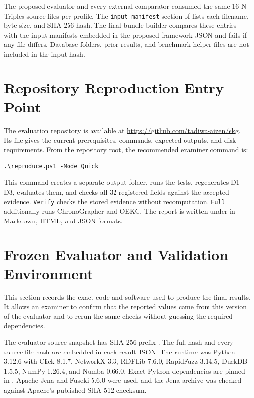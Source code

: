 The proposed evaluator and every external comparator consumed the same 16 N-Triples source files per profile. The \texttt{input\_manifest} section of  lists each filename, byte size, and SHA-256 hash. The final bundle builder compares these entries with the input manifests embedded in the proposed-framework JSON and fails if any file differs. Database folders, prior results, and benchmark helper files are not included in the input hash.

\section{Repository Reproduction Entry Point}

The evaluation repository is available at \url{https://github.com/tadiwa-aizen/ekg}. Its  file gives the current prerequisites, commands, expected outputs, and disk requirements. From the repository root, the recommended examiner command is:

\begin{verbatim}
.\reproduce.ps1 -Mode Quick
\end{verbatim}

This command creates a separate output folder, runs the tests, regenerates D1--D3, evaluates them, and checks all 32 registered fields against the accepted evidence. \texttt{Verify} checks the stored evidence without recomputation. \texttt{Full} additionally runs ChronoGrapher and OEKG. The report is written under  in Markdown, HTML, and JSON formats.

\section{Frozen Evaluator and Validation Environment}

This section records the exact code and software used to produce the final results. It allows an examiner to confirm that the reported values came from this version of the evaluator and to rerun the same checks without guessing the required dependencies.

The evaluator source snapshot has SHA-256 prefix \FrozenEvaluatorHash. The full hash and every source-file hash are embedded in each result JSON. The runtime was Python 3.12.6 with Click 8.1.7, NetworkX 3.3, RDFLib 7.6.0, RapidFuzz 3.14.5, DuckDB 1.5.5, NumPy 1.26.4, and Numba 0.66.0. Exact Python dependencies are pinned in . Apache Jena and Fuseki 5.6.0 were used, and the Jena archive was checked against Apache's published SHA-512 checksum.

